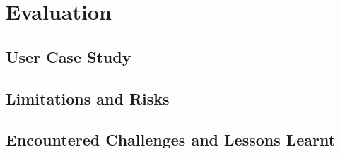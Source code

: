 
\chapter{Evaluation}

\ifpdf
    \graphicspath{{Chapters/Evaluation/Figs/}{Chapters/Evaluation/Figs/}{Chapters/Evaluation/Figs/}}
\else
    \graphicspath{{Chapters/Evaluation/Figs/}{Chapters/Evaluation/Figs/}}
\fi


\section{User Case Study}
\label{evaluation:section:casestudy}
\section{Limitations and Risks}
\label{evaluation:section:risks}
\section{Encountered Challenges and Lessons Learnt}
\label{evaluation:section:challenges}